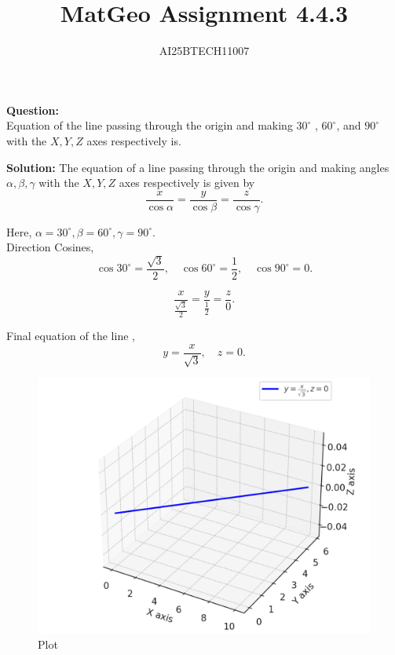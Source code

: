 \documentclass[journal]{IEEEtran}
\begin{document}

\vspace{3cm}

\title{MatGeo Assignment 4.4.3}
\author{AI25BTECH11007}
 \maketitle
{\let\newpage\relax\maketitle}

\renewcommand{\thefigure}{\theenumi}
\renewcommand{\thetable}{\theenumi}
\setlength{\intextsep}{10pt} %


\renewcommand{\thetable}{\theenumi}
\textbf{Question:}\\
Equation of the line passing through the origin and making $30^\circ$
, $60^\circ$, and $90^\circ$ with the $X, Y, Z$ axes respectively is.

\bigskip

\noindent
\textbf{Solution:}
The equation of a line passing through the origin and making angles 
$\alpha, \beta, \gamma$ with the $X, Y, Z$ axes respectively is given by
\[
\frac{x}{\cos \alpha} = \frac{y}{\cos \beta} = \frac{z}{\cos \gamma}.
\]

Here, $\alpha = 30^\circ, \beta = 60^\circ, \gamma = 90^\circ$.\\

Direction Cosines,
\[
\cos 30^\circ = \frac{\sqrt{3}}{2}, \quad 
\cos 60^\circ = \frac{1}{2}, \quad 
\cos 90^\circ = 0.
\]

\[
\frac{x}{\frac{\sqrt{3}}{2}} = \frac{y}{\frac{1}{2}} = \frac{z}{0}.
\]


Final equation of the line ,
\[
y = \frac{x}{\sqrt{3}}, \quad z = 0.
\]

\begin{figure}[H]
    \centering
    \includegraphics[width=0.85\linewidth]{figs/image.png}
    \caption{Plot}
    \label{fig:placeholder}
\end{figure}
\end{document}
